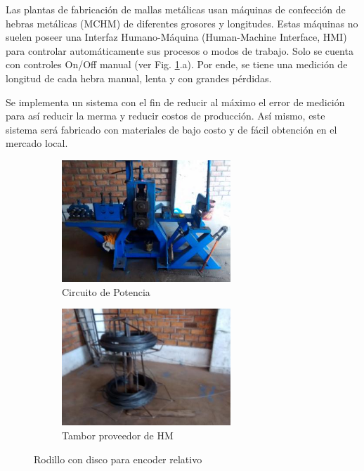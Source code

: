 \documentclass[main_conf.tex]{subfiles}
\begin{document}
Las plantas de fabricación de mallas metálicas usan máquinas de
confección de hebras metálicas (MCHM) de diferentes grosores y
longitudes. Estas máquinas no suelen poseer una Interfaz
Humano-Máquina (Human-Machine Interface, HMI) para controlar
automáticamente sus procesos o modos de trabajo. Solo se 
cuenta con controles On/Off manual (ver Fig.
\ref{maquina_a_automatizar}.a). Por ende, se tiene una medición
de longitud de cada hebra manual, lenta y con grandes pérdidas.

Se implementa un sistema con el fin de reducir al máximo el
error de medición para así reducir la merma y reducir costos de
producción. Así mismo, este sistema será fabricado con materiales
de bajo costo y de fácil obtención en el mercado local.

\begin{figure}[t]
  \centering
  \begin{subfigure}[b]{0.5\textwidth}
    \centering
    \includegraphics[width=2.5in]{../img/maquina/toda.jpg}
    \caption{Circuito de Potencia}
  \end{subfigure}

  \begin{subfigure}[b]{0.5\textwidth}
    \centering
    \includegraphics[width=2.5in]{../img/maquina/tambor.jpg}
    \caption{Tambor proveedor de HM}
  \end{subfigure}

  \caption{Rodillo con disco para encoder relativo}
  \label{maquina_a_automatizar}
\end{figure}
\end{document}
